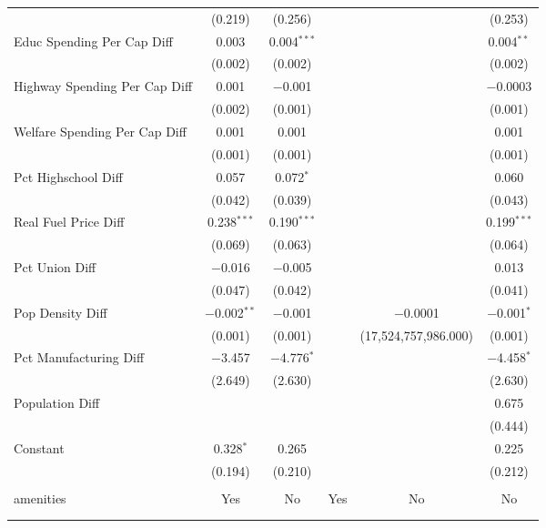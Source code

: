\begin{table}[!htbp]
\begin{tabular}{@{\extracolsep{5pt}}lccccc}
  & (0.219) & (0.256) &  &  & (0.253) \\ 
  Educ Spending Per Cap Diff & 0.003 & 0.004$^{***}$ &  &  & 0.004$^{**}$ \\ 
  & (0.002) & (0.002) &  &  & (0.002) \\ 
  Highway Spending Per Cap Diff & 0.001 & $-$0.001 &  &  & $-$0.0003 \\ 
  & (0.002) & (0.001) &  &  & (0.001) \\ 
  Welfare Spending Per Cap Diff & 0.001 & 0.001 &  &  & 0.001 \\ 
  & (0.001) & (0.001) &  &  & (0.001) \\ 
  Pct Highschool Diff & 0.057 & 0.072$^{*}$ &  &  & 0.060 \\ 
  & (0.042) & (0.039) &  &  & (0.043) \\ 
  Real Fuel Price Diff & 0.238$^{***}$ & 0.190$^{***}$ &  &  & 0.199$^{***}$ \\ 
  & (0.069) & (0.063) &  &  & (0.064) \\ 
  Pct Union Diff & $-$0.016 & $-$0.005 &  &  & 0.013 \\ 
  & (0.047) & (0.042) &  &  & (0.041) \\ 
  Pop Density Diff & $-$0.002$^{**}$ & $-$0.001 &  & $-$0.0001 & $-$0.001$^{*}$ \\ 
  & (0.001) & (0.001) &  & (17,524,757,986.000) & (0.001) \\ 
  Pct Manufacturing Diff & $-$3.457 & $-$4.776$^{*}$ &  &  & $-$4.458$^{*}$ \\ 
  & (2.649) & (2.630) &  &  & (2.630) \\ 
  Population Diff &  &  &  &  & 0.675 \\ 
  &  &  &  &  & (0.444) \\ 
  Constant & 0.328$^{*}$ & 0.265 &  &  & 0.225 \\ 
  & (0.194) & (0.210) &  &  & (0.212) \\ 
 \hline \\[-1.8ex] 
amenities & Yes & No & Yes & No & No \\ 
\hline \\[-1.8ex] 
\hline 
\hline \\[-1.8ex] 
\end{tabular} 
\end{table} 
